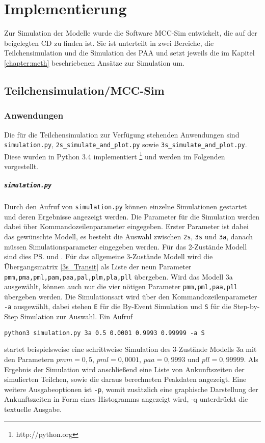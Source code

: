 \chapter{Implementierung}
\label{chapter:imp}

Zur Simulation der Modelle wurde die Software MCC-Sim entwickelt, die auf der beigelegten CD zu finden ist.
Sie ist unterteilt in zwei Bereiche, die Teilchensimulation und die Simulation des PAA und setzt jeweils die im Kapitel \ref{chapter:meth} beschriebenen Ansätze zur Simulation um.


\section{Teilchensimulation/MCC-Sim}


\subsection{Anwendungen}
Die für die Teilchensimulation zur Verfügung stehenden Anwendungen sind \texttt{simulation.py}, \verb!2s_simulate_and_plot.py! sowie  \verb!3s_simulate_and_plot.py!. Diese wurden in Python 3.4 implementiert \footnote{http://python.org} und werden im Folgenden vorgestellt.

\paragraph{\texttt{simulation.py}}

Durch den Aufruf von \texttt{simulation.py} können einzelne Simulationen gestartet und deren Ergebnisse angezeigt werden.
Die Parameter für die Simulation werden dabei über Kommandozeilenparameter eingegeben. Erster Parameter ist dabei das gewünschte Modell, es besteht die Auswahl zwischen \texttt{2s}, \texttt{3s} und \texttt{3a}, danach müssen Simulationsparameter eingegeben werden. Für das 2-Zustände Modell sind dies \ps und \pm. Für das allgemeine 3-Zustände Modell wird die Übergangsmatrix \ref{3s_Transit} als Liste der neun Parameter \verb!pmm,pma,pml,pam,paa,pal,plm,pla,pll! übergeben. Wird das Modell 3a ausgewählt, können auch nur die vier nötigen Parameter \verb!pmm,pml,paa,pll! übergeben werden.
Die Simulationsart wird über den Kommandozeilenparameter \texttt{-a} ausgewählt, dabei stehen \texttt{E} für die By-Event Simulation und \texttt{S} für die Step-by-Step Simulation zur Auswahl.
Ein Aufruf
\begin{verbatim}
python3 simulation.py 3a 0.5 0.0001 0.9993 0.99999 -a S
\end{verbatim}
startet beispielsweise eine schrittweise Simulation des 3-Zustände Modells 3a mit den Parametern $pmm = 0,5$, $pml = 0,0001$, $paa = 0,9993$ und $pll = 0,99999$. Als Ergebnis der Simulation wird anschließend eine Liste von Ankunftszeiten der simulierten Teilchen, sowie die daraus berechneten Peakdaten angezeigt. Eine weitere Ausgabeoptionen ist \texttt{-p}, womit zusätzlich eine graphische Darstellung der Ankunftszeiten in Form eines Histogramms angezeigt wird, -q unterdrückt die textuelle Ausgabe.

